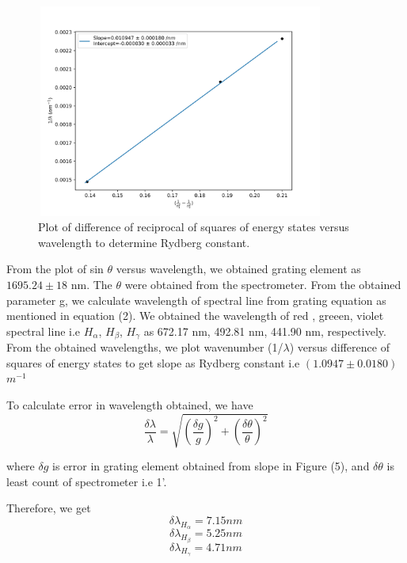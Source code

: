 \documentclass[a4paper, amsfonts, amssymb, amsmath, reprint, showkeys, nofootinbib, twoside]{revtex4-1}
\begin{document}
\begin{figure}[H] %
	\centering
	\includegraphics[width=9.5cm,height=7cm]{5} 
	\caption{Plot of difference of reciprocal of squares of energy states versus wavelength to determine Rydberg constant.}
	\label{5}
\end{figure}

From the plot of sin $\theta$ versus wavelength, we obtained grating element as $1695.24\pm18$ nm. The $\theta$ were obtained from the spectrometer. From the obtained parameter g, we calculate wavelength of spectral line from grating equation as mentioned in equation (2). We obtained the wavelength of red , greeen, violet spectral line i.e $H_\alpha$, $H_\beta$,  $H_\gamma$ as 672.17 nm, 492.81 nm, 441.90 nm, respectively. From the obtained wavelengths, we plot wavenumber (1/$\lambda$) versus difference of squares of energy states to get slope as Rydberg constant i.e $(1.0947\pm0.0180)$ $m^{-1}$

To calculate error in wavelength obtained, we have
\begin{equation}
	\frac{\delta \lambda}{ \lambda}=\sqrt{\left( \frac{\delta g}{ g}\right) ^2+\left( \frac{\delta \theta}{ \theta}\right) ^2}
\end{equation}

where $\delta g$ is error in grating element obtained from slope in Figure (5), and $\delta \theta$ is least count of spectrometer i.e 1'.

Therefore, we get $$\delta \lambda_{H_\alpha} =7.15 nm$$
$$\delta \lambda_{H_\beta} =5.25 nm$$
$$\delta \lambda_{H_\gamma} =4.71 nm$$
\end{document}
